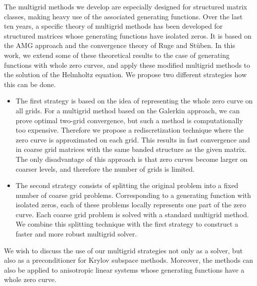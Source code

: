 \documentclass{report}
\begin{document}
The multigrid methods we develop are especially designed for
structured matrix classes, making heavy use of the
associated generating functions. Over the last ten years, a
specific theory of multigrid methods has been developed for
structured matrices whose generating functions have isolated
zeros. It is based on the AMG approach and the convergence
theory of Ruge and St\"uben. In this work, we extend some of
these theoretical results to the case of generating
functions with whole zero curves, and apply these modified
multigrid methods to the solution of the Helmholtz equation.
We propose two different strategies how this can be done.
\begin{itemize}
\item The first strategy is based on the
idea of representing the whole zero curve on all grids. For
a multigrid method based on the Galerkin approach, we can
prove optimal two-grid convergence, but such a method is
computationally too expensive. Therefore we propose a
rediscretization technique where the zero curve is
approximated on each grid. This results in fast convergence
and in coarse grid matrices with the same banded structure
as the given matrix. The only disadvantage of this approach
is that zero curves become larger on coarser levels, and
therefore the number of grids is limited.
\item The second
strategy consists of splitting the original problem into a
fixed number of coarse grid problems. Corresponding to a
generating function with isolated zeros, each of these
problems locally represents one part of the zero curve. Each
coarse grid problem is solved with a standard multigrid
method. We combine this splitting technique with the first
strategy to construct a faster and more robust multigrid
solver.
\end{itemize}
We wish to discuss the use of our
multigrid strategies not only as a solver, but also as a
preconditioner for Krylov subspace methods. Moreover, the
methods can also be applied to anisotropic linear systems
whose generating functions have a whole zero curve.



\end{document}
